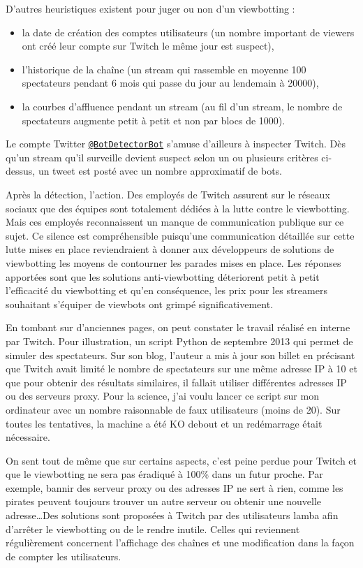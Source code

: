 \documentclass[a4paper]{article}
\begin{document}
D'autres heuristiques existent pour juger ou non d'un viewbotting :
\begin{itemize}
\item la date de création des comptes utilisateurs (un nombre important de viewers ont créé leur compte sur Twitch le même jour est suspect),
\item l'historique de la chaîne (un stream qui rassemble en moyenne 100 spectateurs pendant 6 mois qui passe du jour au lendemain à 20000),
\item la courbes d'affluence pendant un stream (au fil d'un stream, le nombre de spectateurs augmente petit à petit et non par blocs de 1000).
\end{itemize}
Le compte Twitter \href{https://twitter.com/botdetectorbot}{\texttt{@BotDetectorBot}} s'amuse d'ailleurs à inspecter Twitch. Dès qu'un stream qu'il surveille devient suspect selon un ou plusieurs critères ci-dessus, un tweet est posté avec un nombre approximatif de bots.

Après la détection, l'action. Des employés de Twitch assurent sur le réseaux sociaux que des équipes sont totalement dédiées à la lutte contre le viewbotting. Mais ces employés reconnaissent un manque de communication publique sur ce sujet. Ce silence est compréhensible puisqu'une communication détaillée sur cette lutte mises en place reviendraient à donner aux développeurs de solutions de viewbotting les moyens de contourner les parades mises en place. Les réponses apportées sont que les solutions anti-viewbotting déteriorent petit à petit l'efficacité du viewbotting et qu'en conséquence, les prix pour les streamers souhaitant s'équiper de viewbots ont grimpé significativement\cite{RedditJan2015}. 

En tombant sur d'anciennes pages, on peut constater le travail réalisé en interne par Twitch. Pour illustration, un script Python de septembre 2013 qui permet de simuler des spectateurs. Sur son blog, l'auteur a mis à jour son billet en précisant que Twitch avait limité le nombre de spectateurs sur une même adresse IP à 10 et que pour obtenir des résultats similaires, il fallait utiliser différentes adresses IP ou des serveurs proxy\cite{Zhang2013}. Pour la science, j'ai voulu lancer ce script sur mon ordinateur avec un nombre raisonnable de faux utilisateurs (moins de 20). Sur toutes les tentatives, la machine a été KO debout et un redémarrage était nécessaire.

On sent tout de même que sur certains aspects, c'est peine perdue pour Twitch et que le viewbotting ne sera pas éradiqué à 100\% dans un futur proche. Par exemple, bannir des serveur proxy ou des adresses IP ne sert à rien, comme les pirates peuvent toujours trouver un autre serveur ou obtenir une nouvelle adresse\ldots Des solutions sont proposées à Twitch par des utilisateurs lamba afin d'arrêter le viewbotting ou de le rendre inutile. Celles qui reviennent régulièrement concernent l'affichage des chaînes et une modification dans la façon de compter les utilisateurs.
\end{document}
